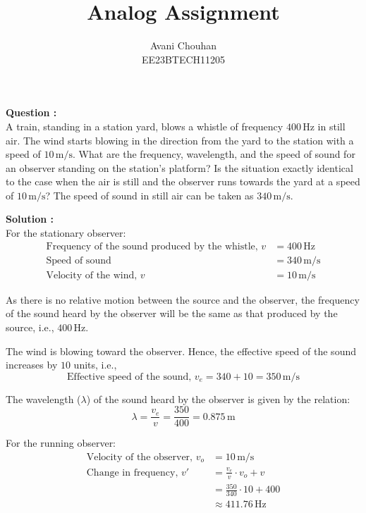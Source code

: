 \documentclass{article}
\begin{document}
\title{Analog Assignment}
\author{Avani Chouhan \\
        EE23BTECH11205}
\maketitle

\textbf{Question : }\\

A train, standing in a station yard, blows a whistle of frequency $400 \, \text{Hz}$ in still air. The wind starts blowing in the direction from the yard to the station with a speed of $10 \, \text{m/s}$. What are the frequency, wavelength, and the speed of sound for an observer standing on the station's platform? Is the situation exactly identical to the case when the air is still and the observer runs towards the yard at a speed of $10\, \text{m/s}$? The speed of sound in still air can be taken as $340\, \text{m/s}$.

\textbf{Solution : }\\

For the stationary observer:
\begin{align}
    \text{Frequency of the sound produced by the whistle, } v &= 400 \, \text{Hz} \\
    \text{Speed of sound} &= 340 \, \text{m/s} \\
    \text{Velocity of the wind, } v &= 10 \, \text{m/s}
\end{align}

As there is no relative motion between the source and the observer, the frequency of the sound heard by the observer will be the same as that produced by the source, i.e., $400 \, \text{Hz}$.

The wind is blowing toward the observer. Hence, the effective speed of the sound increases by $10$ units, i.e.,
\[
\text{Effective speed of the sound, } v_e = 340 + 10 = 350 \, \text{m/s}
\]

The wavelength ($\lambda$) of the sound heard by the observer is given by the relation:
\[
\lambda = \frac{v_e}{v} = \frac{350}{400} = 0.875 \, \text{m}
\]

For the running observer:
\begin{align}
    \text{Velocity of the observer, } v_o &= 10 \, \text{m/s} \\
    \text{Change in frequency, } v' &= \frac{v_e}{v} \cdot v_o + v \\
    &= \frac{350}{340} \cdot 10 + 400 \\
    &\approx 411.76 \, \text{Hz}  
\end{align}
\end{document}
